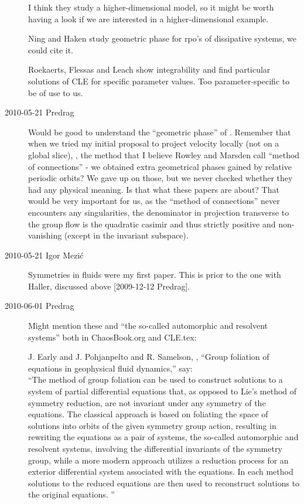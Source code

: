 \begin{description}
I think they study a higher-dimensional model, so it might be worth having a look
if we are interested in a higher-dimensional example.

Ning and Haken study geometric phase
for rpo's of dissipative systems, we could cite it.

 Roekaerts, Flessas and Leach show integrability
and find particular solutions of CLE for specific parameter values.
Too parameter-specific to be of use to us.

\item[2010-05-21 Predrag] Would be good to understand the ``geometric phase''
of .
Remember that when we tried my initial
proposal to project velocity locally (not on a global slice),
,
the method that I believe Rowley and
Marsden call ``method
of connections'' - we obtained extra geometrical
phases gained by relative periodic orbits? We gave up on
those, but we never checked whether they had any physical
meaning. Is that what these papers are about? That would be
very important for us, as the ``method
of connections'' never encounters any singularities, the denominator
in projection transverse to the group flow is the quadratic casimir and
thus strictly positive and non-vanishing (except in the invariant subspace).

\item[2010-05-21 Igor Mezi\'c]
Symmetries in fluids were my first paper.
This is prior to the one with Haller, discussed
 above [2009-12-12 Predrag].

\item[2010-06-01 Predrag]
Might mention these and ``the so-called automorphic and resolvent systems''
both in ChaosBook.org and CLE.tex:

J. Early and J. Pohjanpelto and R. Samelson,
,
{``Group foliation of equations in geophysical fluid dynamics,''}
say:\\
``The method of group foliation can be used to construct solutions
to a system of partial differential equations that, as opposed to Lie's method of
symmetry reduction, are not invariant under any symmetry of the equations.
The classical approach is based on foliating the space of solutions into orbits
of the given symmetry group action, resulting in rewriting the equations as a
pair of systems, the so-called automorphic and resolvent systems, involving the
differential invariants of the symmetry group, while a more modern approach
utilizes a reduction process for an exterior differential system associated with
the equations. In each method solutions to the reduced equations are then used
to reconstruct solutions to the original equations.
''



\end{description}
